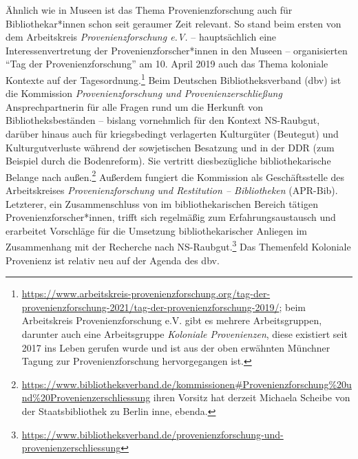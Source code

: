 \documentclass[a4paper,
fontsize=11pt,
oneside,
numbers=noperiodatend,
parskip=half-,
bibliography=totoc,
final
]{scrartcl}
\begin{document}
Ähnlich wie in Museen ist das Thema Provenienzforschung auch für
Bibliothekar*innen schon seit geraumer Zeit relevant. So stand beim
ersten von dem Arbeitskreis \emph{Provenienzforschung e.V.} --
hauptsächlich eine Interessenvertretung der Provenienzforscher*innen in
den Museen -- organisierten \enquote{Tag der Provenienzforschung} am 10.
April 2019 auch das Thema koloniale Kontexte auf der
Tagesordnung.\footnote{\url{https://www.arbeitskreis-provenienzforschung.org/tag-der-provenienzforschung-2021/tag-der-provenienzforschung-2019/};
  beim Arbeitskreis Provenienzforschung e.V. gibt es mehrere
  Arbeitsgruppen, darunter auch eine Arbeitsgruppe \emph{Koloniale
  Provenienzen}, diese existiert seit 2017 ins Leben gerufen wurde und
  ist aus der oben erwähnten Münchner Tagung zur Provenienzforschung
  hervorgegangen ist.} Beim Deutschen Bibliotheksverband (dbv) ist die
Kommission \emph{Provenienzforschung und Provenienzerschließung}
Ansprechpartnerin für alle Fragen rund um die Herkunft von
Bibliotheksbeständen -- bislang vornehmlich für den Kontext NS-Raubgut,
darüber hinaus auch für kriegsbedingt verlagerten Kulturgüter (Beutegut)
und Kulturgutverluste während der sowjetischen Besatzung und in der DDR
(zum Beispiel durch die Bodenreform). Sie vertritt diesbezügliche
bibliothekarische Belange nach außen.\footnote{\url{https://www.bibliotheksverband.de/kommissionen\#Provenienzforschung\%20und\%20Provenienzerschliessung}
  ihren Vorsitz hat derzeit Michaela Scheibe von der Staatsbibliothek zu
  Berlin inne, ebenda.} Außerdem fungiert die Kommission als
Geschäftsstelle des Arbeitskreises \emph{Provenienzforschung und
Restitution -- Bibliotheken} (APR-Bib). Letzterer, ein Zusammenschluss
von im bibliothekarischen Bereich tätigen Provenienzforscher*innen,
trifft sich regelmäßig zum Erfahrungsaustausch und erarbeitet Vorschläge
für die Umsetzung bibliothekarischer Anliegen im Zusammenhang mit der
Recherche nach NS-Raubgut.\footnote{\url{https://www.bibliotheksverband.de/provenienzforschung-und-provenienzerschliessung}}
Das Themenfeld Koloniale Provenienz ist relativ neu auf der Agenda des
dbv.
\end{document}
